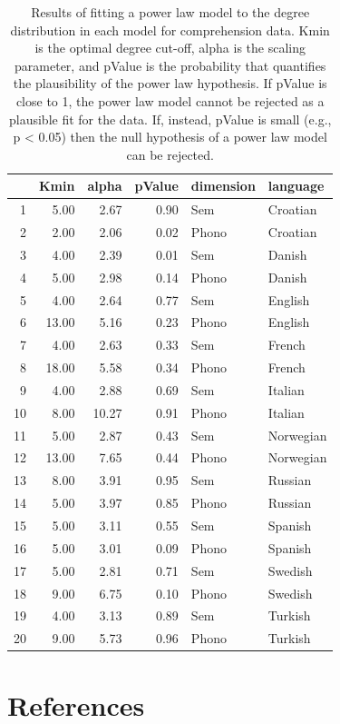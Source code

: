 \documentclass[english,floatsintext,man]{apa6}
\theoremstyle{definition}
\theoremstyle{definition}
\theoremstyle{definition}
\theoremstyle{remark}
\begin{document}
\begin{table}[H]
\centering
\begin{tabular}{rrrrll}
  \hline
 & Kmin & alpha & pValue & dimension & language \\ 
  \hline
1 & 5.00 & 2.67 & 0.90 & Sem & Croatian \\ 
  2 & 2.00 & 2.06 & 0.02 & Phono & Croatian \\ 
  3 & 4.00 & 2.39 & 0.01 & Sem & Danish \\ 
  4 & 5.00 & 2.98 & 0.14 & Phono & Danish \\ 
  5 & 4.00 & 2.64 & 0.77 & Sem & English \\ 
  6 & 13.00 & 5.16 & 0.23 & Phono & English \\ 
  7 & 4.00 & 2.63 & 0.33 & Sem & French \\ 
  8 & 18.00 & 5.58 & 0.34 & Phono & French \\ 
  9 & 4.00 & 2.88 & 0.69 & Sem & Italian \\ 
  10 & 8.00 & 10.27 & 0.91 & Phono & Italian \\ 
  11 & 5.00 & 2.87 & 0.43 & Sem & Norwegian \\ 
  12 & 13.00 & 7.65 & 0.44 & Phono & Norwegian \\ 
  13 & 8.00 & 3.91 & 0.95 & Sem & Russian \\ 
  14 & 5.00 & 3.97 & 0.85 & Phono & Russian \\ 
  15 & 5.00 & 3.11 & 0.55 & Sem & Spanish \\ 
  16 & 5.00 & 3.01 & 0.09 & Phono & Spanish \\ 
  17 & 5.00 & 2.81 & 0.71 & Sem & Swedish \\ 
  18 & 9.00 & 6.75 & 0.10 & Phono & Swedish \\ 
  19 & 4.00 & 3.13 & 0.89 & Sem & Turkish \\ 
  20 & 9.00 & 5.73 & 0.96 & Phono & Turkish \\ 
   \hline
\end{tabular}
\caption{Results of fitting a power law model to the degree distribution in each model for comprehension data. Kmin is the optimal degree cut-off, alpha is the scaling parameter, and pValue is the probability that quantifies the plausibility of the power law hypothesis. If pValue is close to 1, the power law model cannot be rejected as a plausible fit for the data. If, instead, pValue is small (e.g., p < 0.05) then the null hypothesis of a power law model can be rejected.} 
\end{table}

\section{References}\label{references}
\end{document}
